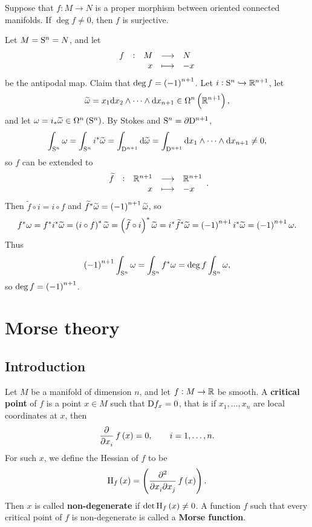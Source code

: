 \pagebreak

\begin{exercise*}
Suppose that $ f : M \to N $ is a proper morphism between oriented connected manifolds. If $ \deg f \ne 0 $, then $ f $ is surjective.
\end{exercise*}

\begin{example}
Let $ M = \S^n = N $, and let
$$ \function[f]{M}{N}{x}{-x} $$
be the antipodal map. Claim that $ \deg f = \br{-1}^{n + 1} $. Let $ i : \S^n \hookrightarrow \RR^{n + 1} $, let
$$ \widetilde{\omega} = x_1 \d x_2 \wedge \dots \wedge \d x_{n + 1}\in \Omega^n\br{\RR^{n + 1}}, $$
and let $ \omega = i_*\widetilde{\omega} \in \Omega^n\br{\S^n} $. By Stokes and $ \S^n = \partial\D^{n + 1} $,
$$ \int_{\S^n} \omega = \int_{\S^n} i^*\widetilde{\omega} = \int_{\D^{n + 1}} \d\widetilde{\omega} = \int_{\D^{n + 1}} \d x_1 \wedge \dots \wedge \d x_{n + 1} \ne 0, $$
so $ f $ can be extended to
$$ \function[\widetilde{f}]{\RR^{n + 1}}{\RR^{n + 1}}{x}{-x}. $$
Then $ \widetilde{f} \circ i = i \circ f $ and $ \widetilde{f}^*\widetilde{\omega} = \br{-1}^{n + 1}\widetilde{\omega} $, so
$$ f^*\omega = f^*i^*\widetilde{\omega} = \br{i \circ f}^*\widetilde{\omega} = \br{\widetilde{f} \circ i}^*\widetilde{\omega} = i^*\widetilde{f}^*\widetilde{\omega} = \br{-1}^{n + 1}i^*\widetilde{\omega} = \br{-1}^{n + 1}\omega. $$
Thus
$$ \br{-1}^{n + 1}\int_{\S^n} \omega = \int_{\S^n} f^*\omega = \deg f\int_{\S^n} \omega, $$
so $ \deg f = \br{-1}^{n + 1} $.
\end{example}

\pagebreak

\section{Morse theory}

\subsection{Introduction}

\begin{definition}
Let $ M $ be a manifold of dimension $ n $, and let $ f : M \to \RR $ be smooth. A \textbf{critical point} of $ f $ is a point $ x \in M $ such that $ \D f_x = 0 $, that is if $ x_1, \dots, x_n $ are local coordinates at $ x $, then
$$ \dpd{}{x_i}f\br{x} = 0, \qquad i = 1, \dots, n. $$
For such $ x $, we define the Hessian of $ f $ to be
$$ \H_f\br{x} = \br{\dmd{}{2}{x_i}{}{x_j}{}f\br{x}}. $$
Then $ x $ is called \textbf{non-degenerate} if $ \det \H_f\br{x} \ne 0 $. A function $ f $ such that every critical point of $ f $ is non-degenerate is called a \textbf{Morse function}.
\end{definition}

